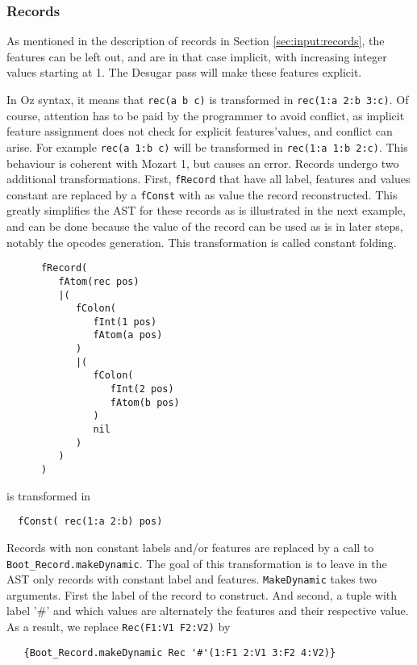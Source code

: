 \documentclass[a4paper]{memoir}
\begin{document}
\subsubsection{Records}\label{sec:arch:desugar:records}
As mentioned in the description of records in Section \ref{sec:input:records},
the features can be left out, and are in that case implicit, with increasing
integer values starting at 1. The Desugar pass will make these features explicit.

In Oz syntax, it means that \lstinline!rec(a b c)! is transformed in \lstinline!rec(1:a 2:b 3:c)!. Of course, attention has to be paid by the programmer to avoid conflict, as implicit feature assignment does not check for explicit features'values, and conflict can arise. For example \lstinline!rec(a 1:b c)! will be transformed in \lstinline!rec(1:a 1:b 2:c)!. This behaviour is coherent with Mozart 1, but causes an error. %
Records undergo two additional transformations. First, \lstinline!fRecord! that
have all label, features and values constant are replaced by a
\lstinline!fConst! with as value the record reconstructed. This greatly
simplifies the AST for these records as is illustrated in the next example, and
can be done because the value of the record can be used as is in later steps,
notably the opcodes generation. This transformation is called constant folding.
\begin{lstlisting}
      fRecord(
         fAtom(rec pos)
         |(
            fColon(
               fInt(1 pos)
               fAtom(a pos)
            )
            |(
               fColon(
                  fInt(2 pos)
                  fAtom(b pos)
               )
               nil
            )
         )
      )
\end{lstlisting}
is transformed in
\begin{lstlisting}
  fConst( rec(1:a 2:b) pos)
\end{lstlisting}


Records with non constant labels and/or features are replaced by a call to
\lstinline!Boot_Record.makeDynamic!. The goal of this transformation is to leave
in the AST only records with constant label and features.
\lstinline!MakeDynamic! takes two arguments. First the label of the record to construct. And second, a tuple with label '\#' and which values are alternately the features and their respective value. As a result, we replace \lstinline!Rec(F1:V1 F2:V2)! by 
\begin{lstlisting}
   {Boot_Record.makeDynamic Rec '#'(1:F1 2:V1 3:F2 4:V2)}
\end{lstlisting}
\end{document}
